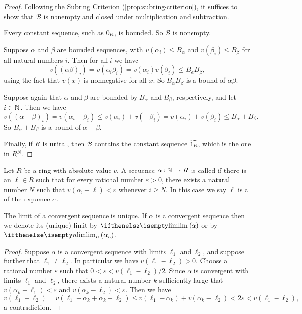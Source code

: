 \begin{proof}
Following the Subring Criterion (\ref{prop:subring-criterion}), it suffices to show that \(\mathcal{B}\) is nonempty and closed under multiplication and subtraction.
\begin{inlineproplist}
\item Every constant sequence, such as \(\widetilde{0_R}\), is bounded. So \(\mathcal{B}\) is nonempty.
\item Suppose \(\alpha\) and \(\beta\) are bounded sequences, with \(v(\alpha_i) \leq B_\alpha\) and \(v(\beta_i) \leq B_\beta\) for all natural numbers \(i\). Then for all \(i\) we have  \[ v((\alpha\beta)_i) = v(\alpha_i \beta_i) = v(\alpha_i)v(\beta_i) \leq B_\alpha B_\beta, \] using the fact that \(v(x)\) is nonnegative for all \(x\). So \(B_\alpha B_\beta\) is a bound of \(\alpha\beta\).
\item Suppose again that \(\alpha\) and \(\beta\) are bounded by \(B_\alpha\) and \(B_\beta\), respectively, and let \(i \in \mathbb{N}\). Then we have \[ v((\alpha - \beta)_i) = v(\alpha_i - \beta_i) \leq v(\alpha_i) + v(-\beta_i) = v(\alpha_i) + v(\beta_i) \leq B_\alpha + B_\beta. \] So \(B_\alpha + B_\beta\) is a bound of \(\alpha - \beta\).
\end{inlineproplist}
Finally, if \(R\) is unital, then \(\mathcal{B}\) contains the constant sequence \(\widetilde{1_R}\), which is the one in \(R^{\mathbb{N}}\).
\end{proof}

\begin{dfn}
Let \(R\) be a ring with absolute value \(v\). A sequence \(\alpha : \mathbb{N} \rightarrow R\) is called  if there is an \(\ell \in R\) such that for every rational number \(\varepsilon > 0\), there exists a natural number \(N\) such that \(v(\alpha_i - \ell) < \varepsilon\) whenever \(i \geq N\). In this case we say \(\ell\) is a  of the sequence \(\alpha\).
\end{dfn}

\begin{prop}
The limit of a convergent sequence is unique. If \(\alpha\) is a convergent sequence then we denote its (unique) limit by \(\LIM{\alpha}\) or by \(\LIM[n]{\alpha_n}\).
\end{prop}

\begin{proof}
Suppose \(\alpha\) is a convergent sequence with limits \(\ell_1\) and \(\ell_2\), and suppose further that \(\ell_1 \neq \ell_2\). In particular we have \(v(\ell_1 - \ell_2) > 0\). Choose a rational number \(\varepsilon\) such that \(0 < \varepsilon < v(\ell_1 - \ell_2)/2\). Since \(\alpha\) is convergent with limits \(\ell_1\) and \(\ell_2\), there exists a natural number \(k\) sufficiently large that \(v(\alpha_k - \ell_1) < \varepsilon\) and \(v(\alpha_k - \ell_2) < \varepsilon\). Then we have \[ v(\ell_1 - \ell_2) = v(\ell_1 - \alpha_k + \alpha_k - \ell_2) \leq v(\ell_1 - \alpha_k) + v(\alpha_k - \ell_2) < 2\varepsilon < v(\ell_1 - \ell_2), \] a contradiction.
\end{proof}

